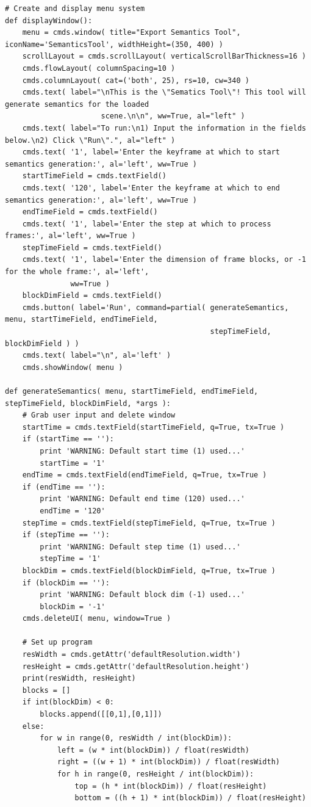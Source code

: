 \documentclass[conference]{IEEEtran}
\begin{document}
{\begin{verbatim}
# Create and display menu system
def displayWindow():
    menu = cmds.window( title="Export Semantics Tool", iconName='SemanticsTool', widthHeight=(350, 400) )
    scrollLayout = cmds.scrollLayout( verticalScrollBarThickness=16 )
    cmds.flowLayout( columnSpacing=10 )
    cmds.columnLayout( cat=('both', 25), rs=10, cw=340 )
    cmds.text( label="\nThis is the \"Sematics Tool\"! This tool will generate semantics for the loaded
                      scene.\n\n", ww=True, al="left" )
    cmds.text( label="To run:\n1) Input the information in the fields below.\n2) Click \"Run\".", al="left" )
    cmds.text( '1', label='Enter the keyframe at which to start semantics generation:', al='left', ww=True )
    startTimeField = cmds.textField()
    cmds.text( '120', label='Enter the keyframe at which to end semantics generation:', al='left', ww=True )
    endTimeField = cmds.textField()
    cmds.text( '1', label='Enter the step at which to process frames:', al='left', ww=True )
    stepTimeField = cmds.textField()
    cmds.text( '1', label='Enter the dimension of frame blocks, or -1 for the whole frame:', al='left',
               ww=True )
    blockDimField = cmds.textField()
    cmds.button( label='Run', command=partial( generateSemantics, menu, startTimeField, endTimeField,
                                               stepTimeField, blockDimField ) )
    cmds.text( label="\n", al='left' )
    cmds.showWindow( menu )

def generateSemantics( menu, startTimeField, endTimeField, stepTimeField, blockDimField, *args ):
    # Grab user input and delete window
    startTime = cmds.textField(startTimeField, q=True, tx=True )
    if (startTime == ''):
        print 'WARNING: Default start time (1) used...'
        startTime = '1'
    endTime = cmds.textField(endTimeField, q=True, tx=True )
    if (endTime == ''):
        print 'WARNING: Default end time (120) used...'
        endTime = '120'
    stepTime = cmds.textField(stepTimeField, q=True, tx=True )
    if (stepTime == ''):
        print 'WARNING: Default step time (1) used...'
        stepTime = '1'
    blockDim = cmds.textField(blockDimField, q=True, tx=True )
    if (blockDim == ''):
        print 'WARNING: Default block dim (-1) used...'
        blockDim = '-1'
    cmds.deleteUI( menu, window=True )
    
    # Set up program
    resWidth = cmds.getAttr('defaultResolution.width')
    resHeight = cmds.getAttr('defaultResolution.height')
    print(resWidth, resHeight)
    blocks = []
    if int(blockDim) < 0:
        blocks.append([[0,1],[0,1]])
    else:
        for w in range(0, resWidth / int(blockDim)):
            left = (w * int(blockDim)) / float(resWidth)
            right = ((w + 1) * int(blockDim)) / float(resWidth)
            for h in range(0, resHeight / int(blockDim)):
                top = (h * int(blockDim)) / float(resHeight)
                bottom = ((h + 1) * int(blockDim)) / float(resHeight)
                

\end{verbatim}}
\end{document}

